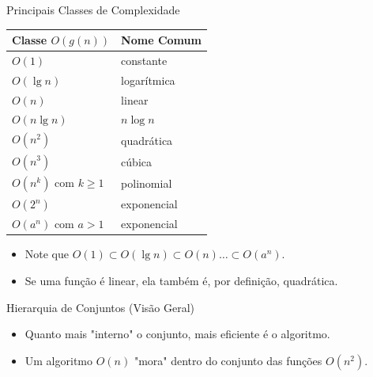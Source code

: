 \documentclass[aspectratio=169]{beamer}
\begin{document}
\begin{frame}{Principais Classes de Complexidade}
    \centering
    \small
    \begin{tabular}{|l|l|}
        \hline
        \textbf{Classe $O(g(n))$} & \textbf{Nome Comum} \\ \hline
        $O(1)$ & constante \\ \hline
        $O(\lg n)$ & logarítmica \\ \hline
        $O(n)$ & linear \\ \hline
        $O(n \lg n)$ & $n \log n$ \\ \hline
        $O(n^2)$ & quadrática \\ \hline
        $O(n^3)$ & cúbica \\ \hline
        $O(n^k) \text{ com } k \ge 1$ & polinomial \\ \hline
        $O(2^n)$ & exponencial \\ \hline
        $O(a^n) \text{ com } a > 1$ & exponencial \\ \hline
    \end{tabular}
    
    \vspace{0.4cm}
    \begin{itemize}
        \item Note que $O(1) \subset O(\lg n) \subset O(n) \dots \subset O(a^n)$.
        \item Se uma função é linear, ela também é, por definição, quadrática.
    \end{itemize}
\end{frame}

\begin{frame}{Hierarquia de Conjuntos (Visão Geral)}
    \centering
    
    \vspace{0.3cm}
    \begin{itemize}
        \item Quanto mais "interno" o conjunto, mais eficiente é o algoritmo.
        \item Um algoritmo $O(n)$ "mora" dentro do conjunto das funções $O(n^2)$.
    \end{itemize}
\end{frame}
\end{document}
